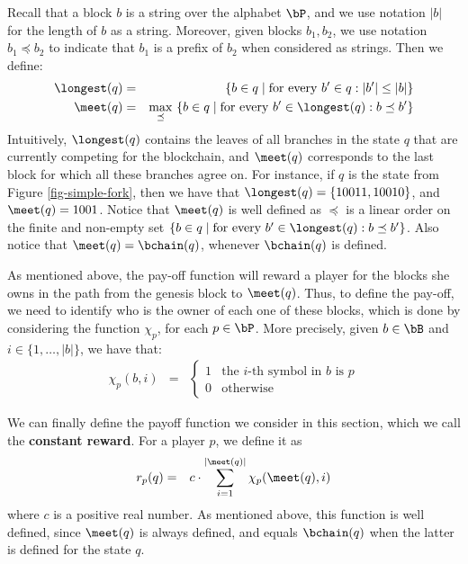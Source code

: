Recall that a block $b$ is a string over the alphabet $\bP$, and we use notation $|b|$ for the length of $b$ as a string. Moreover, given blocks $b_1, b_2$, we use notation $b_1 \preceq b_2$ to indicate that $b_1$ is a prefix of $b_2$  when considered as strings. Then we define: 
\begin{eqnarray*}
\longest(q) & = & \{ b \in q \mid \text{for every } b' \in q: |b'| \leq |b|\}\\
\meet(q) & = & {\displaystyle \max_{\preceq} \ \{b \in q \mid \text{for every } b' \in \longest(q): b \preceq b'\}}
\end{eqnarray*}
Intuitively, $\longest(q)$ contains the leaves of all branches in the state $q$ that are currently competing for the blockchain, and $\meet(q)$ corresponds to the last block for which all these branches agree on. For instance, if $q$ is the state from Figure \ref{fig-simple-fork}, then we have that $\longest(q)=\{10011,10010\}$, and $\meet(q)=1001$. Notice that $\meet(q)$ is well defined as $\preceq$ is a linear order on the finite and non-empty set $\{b \in q \mid \text{for every } b' \in \longest(q): b \preceq b'\}$. Also notice that $\meet(q)=\bchain(q)$, whenever $\bchain(q)$ is defined.

As mentioned above, the pay-off function will reward a player for the blocks she owns in the path from the genesis block to $\meet(q)$. Thus, to define the pay-off, we need to identify who is the owner of each one of these blocks, which is done by considering the function $\chi_p$, for each $p \in \bP$. More precisely, given $b \in \bB$ and $i \in \{1, \ldots, |b|\}$, we have that:
\begin{eqnarray*}
\chi_p(b,i) & = & 
\begin{cases}
1 & \text{the } i\text{-th symbol in } b \text{ is } p\\
0 & \text{otherwise}
\end{cases}
\end{eqnarray*}

We can finally define the payoff function we consider in this section, which we call the \textbf{constant reward}. For a player $p$, we define it as 
\begin{eqnarray*}
r_p(q) & = & 
{\displaystyle c \cdot \sum_{i=1}^{|\meet(q)|} \chi_p(\meet(q),i)} 
\end{eqnarray*}
where $c$ is a positive real number. As mentioned above, this function is well defined, since $\meet(q)$ is always defined, and equals $\bchain(q)$ when the latter is defined for the state $q$.
 
